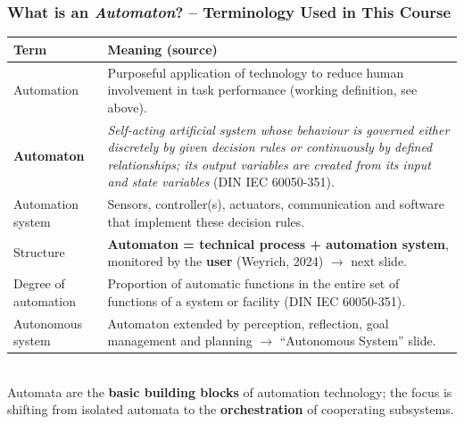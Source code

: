 \begin{frame}
	\frametitle{What is an \textit{Automaton}? -- Terminology Used in This Course}
	\footnotesize
	\renewcommand{\arraystretch}{1.1}
	\begin{tabular}{@{}p{}p{}@{}}
		\toprule
		\textbf{Term} & \textbf{Meaning (source)}\\
		\midrule
		Automation & Purposeful application of technology to reduce human involvement in task performance (working definition, see above).\\
		\textbf{Automaton} & \emph{Self-acting artificial system whose behaviour is governed either discretely by given decision rules or continuously by defined relationships; its output variables are created from its input and state variables} (DIN IEC 60050-351).\\
		Automation system & Sensors, controller(s), actuators, communication and software that implement these decision rules.\\
		Structure & \textbf{Automaton = technical process + automation system}, monitored by the \textbf{user} (Weyrich, 2024) $\rightarrow$ next slide.\\
		Degree of automation & Proportion of automatic functions in the entire set of functions of a system or facility (DIN IEC 60050-351).\\
		Autonomous system & Automaton extended by perception, reflection, goal management and planning $\rightarrow$ ``Autonomous System'' slide.\\
		\bottomrule
	\end{tabular}\\[2mm]
	\small Automata are the \textbf{basic building blocks} of automation technology; the focus is shifting from isolated automata to the \textbf{orchestration} of cooperating subsystems.
\end{frame}
